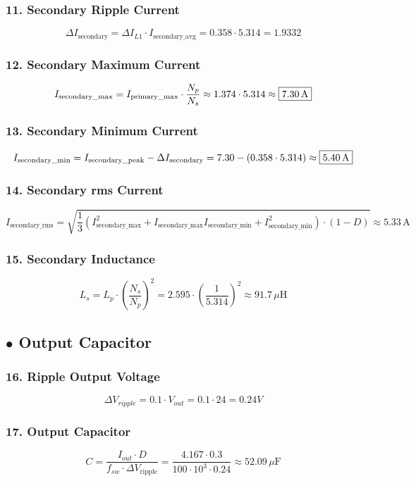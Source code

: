 \subsubsection*{11. Secondary Ripple Current}
\[
\Delta I_{\text{secondary}} = \Delta I_{L1} \cdot I_{\text{secondary\_avg}} =0.358 \cdot 5.314 = \boxed{1.9332}
\]
\subsubsection*{12. Secondary Maximum Current }
\[
I_{\text{secondary\_max}} = I_{\text{primary\_max}} \cdot \frac{N_p}{N_s} 
\approx 1.374 \cdot 5.314 \approx \boxed{7.30\,\text{A}} \\
\]
\subsubsection*{13. Secondary Minimum Current}
\[
I_{\text{secondary\_min}} = I_{\text{secondary\_peak}} - \Delta I_{\text{secondary}} \\
= 7.30 - (0.358 \cdot 5.314) \approx \boxed{5.40\,\text{A}} \\
\]
\subsubsection*{14. Secondary rms Current}
\[
I_{\text{secondary\_rms}} = \sqrt{\frac{1}{3} \left( I_{\text{secondary\_max}}^2 + I_{\text{secondary\_max}}I_{\text{secondary\_min}} + I_{\text{secondary\_min}}^2 \right) \cdot (1 - D)} 
\approx \boxed{5.33\,\text{A}}
\]
\subsubsection*{15. Secondary Inductance}
\[
L_s = L_p \cdot \left( \frac{N_s}{N_p} \right)^2 
= 2.595 \cdot \left( \frac{1}{5.314} \right)^2 \approx \boxed{91.7\,\mu\text{H}}
\]
\subsection*{$\bullet$ Output Capacitor}
\subsubsection*{16. Ripple Output Voltage}
\[
\Delta V_{ripple} = 0.1 \cdot V_{out} = 0.1 \cdot 24 = \boxed{0.24V}
\]
\subsubsection*{17. Output Capacitor}
\[
C = \frac{I_{out} \cdot D}{f_{sw} \cdot \Delta V_{\text{ripple}}} 
= \frac{4.167 \cdot 0.3}{100 \cdot 10^3 \cdot 0.24} \approx \boxed{52.09\,\mu\text{F}}
\]
